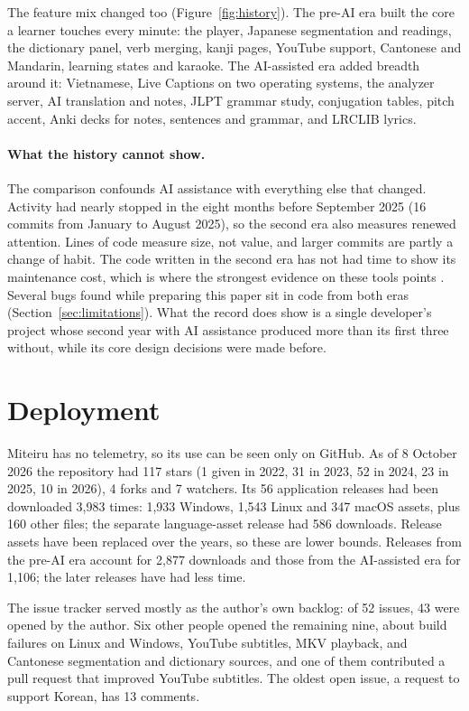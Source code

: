 ﻿\documentclass[11pt,a4paper]{article}
\begin{document}
The feature mix changed too (Figure~\ref{fig:history}). The pre-AI era built the core a learner touches every minute: the player, Japanese segmentation and readings, the dictionary panel, verb merging, kanji pages, YouTube support, Cantonese and Mandarin, learning states and karaoke. The AI-assisted era added breadth around it: Vietnamese, Live Captions on two operating systems, the analyzer server, AI translation and notes, JLPT grammar study, conjugation tables, pitch accent, Anki decks for notes, sentences and grammar, and LRCLIB lyrics.

\paragraph{What the history cannot show.}
The comparison confounds AI assistance with everything else that changed. Activity had nearly stopped in the eight months before September 2025 (16 commits from January to August 2025), so the second era also measures renewed attention. Lines of code measure size, not value, and larger commits are partly a change of habit. The code written in the second era has not had time to show its maintenance cost, which is where the strongest evidence on these tools points \citep{he2026speed,liu2026debt}. Several bugs found while preparing this paper sit in code from both eras (Section~\ref{sec:limitations}). What the record does show is a single developer's project whose second year with AI assistance produced more than its first three without, while its core design decisions were made before.

\section{Deployment}
\label{sec:deployment}

Miteiru has no telemetry, so its use can be seen only on GitHub. As of 8 October 2026 the repository had 117 stars (1 given in 2022, 31 in 2023, 52 in 2024, 23 in 2025, 10 in 2026), 4 forks and 7 watchers. Its 56 application releases had been downloaded 3,983 times: 1,933 Windows, 1,543 Linux and 347 macOS assets, plus 160 other files; the separate language-asset release had 586 downloads. Release assets have been replaced over the years, so these are lower bounds. Releases from the pre-AI era account for 2,877 downloads and those from the AI-assisted era for 1,106; the later releases have had less time.

The issue tracker served mostly as the author's own backlog: of 52 issues, 43 were opened by the author. Six other people opened the remaining nine, about build failures on Linux and Windows, YouTube subtitles, MKV playback, and Cantonese segmentation and dictionary sources, and one of them contributed a pull request that improved YouTube subtitles. The oldest open issue, a request to support Korean, has 13 comments.
\end{document}
